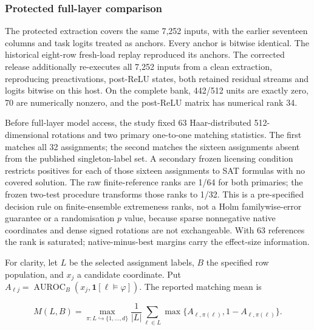 \documentclass[
  british,
  11pt,
  a4paper,
]{article}
\begin{document}
\subsubsection{Protected full-layer
comparison}\label{protected-full-layer-comparison}

The protected extraction covers the same 7,252 inputs, with the earlier
seventeen columns and task logits treated as anchors. Every anchor is
bitwise identical. The historical eight-row fresh-load replay reproduced
its anchors. The corrected release additionally re-executes all 7,252
inputs from a clean extraction, reproducing preactivations, post-ReLU
states, both retained residual streams and logits bitwise on this host.
On the complete bank, 442/512 units are exactly zero, 70 are numerically
nonzero, and the post-ReLU matrix has numerical rank 34.

Before full-layer model access, the study fixed 63 Haar-distributed
512-dimensional rotations and two primary one-to-one matching
statistics. The first matches all 32 assignments; the second matches the
sixteen assignments absent from the published singleton-label set. A
secondary frozen licensing condition restricts positives for each of
those sixteen assignments to SAT formulas with no covered solution. The
raw finite-reference ranks are 1/64 for both primaries; the frozen
two-test procedure transforms those ranks to 1/32. This is a
pre-specified decision rule on finite-ensemble extremeness ranks, not a
Holm familywise-error guarantee or a randomisation \(p\) value, because
sparse nonnegative native coordinates and dense signed rotations are not
exchangeable. With 63 references the rank is saturated;
native-minus-best margins carry the effect-size information.

For clarity, let \(L\) be the selected assignment labels, \(B\) the
specified row population, and \(x_j\) a candidate coordinate. Put
\(A_{\ell j}=\operatorname{AUROC}_B(x_j,\mathbf1[\ell\models\varphi])\).
The reported matching mean is

\[M(L,B)=\max_{\pi:L\hookrightarrow\{1,\ldots,d\}}\frac{1}{|L|}\sum_{\ell\in L}\max\{A_{\ell,\pi(\ell)},1-A_{\ell,\pi(\ell)}\}.\]
\end{document}
